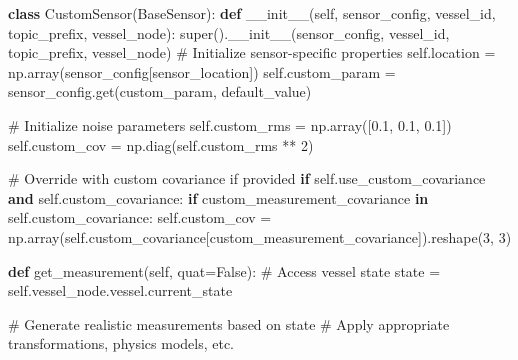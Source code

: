 \documentclass[
  letterpaper,
  DIV=11,
  numbers=noendperiod]{scrreprt}
\newenvironment{Shaded}{\begin{snugshade}}{\end{snugshade}}
\newcommand{\BuiltInTok}[1]{\textcolor[rgb]{0.00,0.23,0.31}{#1}}
\newcommand{\CommentTok}[1]{\textcolor[rgb]{0.37,0.37,0.37}{#1}}
\newcommand{\ControlFlowTok}[1]{\textcolor[rgb]{0.00,0.23,0.31}{\textbf{#1}}}
\newcommand{\DecValTok}[1]{\textcolor[rgb]{0.68,0.00,0.00}{#1}}
\newcommand{\FloatTok}[1]{\textcolor[rgb]{0.68,0.00,0.00}{#1}}
\newcommand{\FunctionTok}[1]{\textcolor[rgb]{0.28,0.35,0.67}{#1}}
\newcommand{\KeywordTok}[1]{\textcolor[rgb]{0.00,0.23,0.31}{\textbf{#1}}}
\newcommand{\NormalTok}[1]{\textcolor[rgb]{0.00,0.23,0.31}{#1}}
\newcommand{\OperatorTok}[1]{\textcolor[rgb]{0.37,0.37,0.37}{#1}}
\newcommand{\StringTok}[1]{\textcolor[rgb]{0.13,0.47,0.30}{#1}}
\newcommand{\VariableTok}[1]{\textcolor[rgb]{0.07,0.07,0.07}{#1}}
\begin{document}
\begin{Shaded}
\begin{Highlighting}[]
\KeywordTok{class}\NormalTok{ CustomSensor(BaseSensor):}
    \KeywordTok{def} \FunctionTok{\_\_init\_\_}\NormalTok{(}\VariableTok{self}\NormalTok{, sensor\_config, vessel\_id, topic\_prefix, vessel\_node):}
        \BuiltInTok{super}\NormalTok{().}\FunctionTok{\_\_init\_\_}\NormalTok{(sensor\_config, vessel\_id, topic\_prefix, vessel\_node)}
        \CommentTok{\# Initialize sensor{-}specific properties}
        \VariableTok{self}\NormalTok{.location }\OperatorTok{=}\NormalTok{ np.array(sensor\_config[}\StringTok{\textquotesingle{}sensor\_location\textquotesingle{}}\NormalTok{])}
        \VariableTok{self}\NormalTok{.custom\_param }\OperatorTok{=}\NormalTok{ sensor\_config.get(}\StringTok{\textquotesingle{}custom\_param\textquotesingle{}}\NormalTok{, default\_value)}
        
        \CommentTok{\# Initialize noise parameters}
        \VariableTok{self}\NormalTok{.custom\_rms }\OperatorTok{=}\NormalTok{ np.array([}\FloatTok{0.1}\NormalTok{, }\FloatTok{0.1}\NormalTok{, }\FloatTok{0.1}\NormalTok{])}
        \VariableTok{self}\NormalTok{.custom\_cov }\OperatorTok{=}\NormalTok{ np.diag(}\VariableTok{self}\NormalTok{.custom\_rms }\OperatorTok{**} \DecValTok{2}\NormalTok{)}
        
        \CommentTok{\# Override with custom covariance if provided}
        \ControlFlowTok{if} \VariableTok{self}\NormalTok{.use\_custom\_covariance }\KeywordTok{and} \VariableTok{self}\NormalTok{.custom\_covariance:}
            \ControlFlowTok{if} \StringTok{\textquotesingle{}custom\_measurement\_covariance\textquotesingle{}} \KeywordTok{in} \VariableTok{self}\NormalTok{.custom\_covariance:}
                \VariableTok{self}\NormalTok{.custom\_cov }\OperatorTok{=}\NormalTok{ np.array(}\VariableTok{self}\NormalTok{.custom\_covariance[}\StringTok{\textquotesingle{}custom\_measurement\_covariance\textquotesingle{}}\NormalTok{]).reshape(}\DecValTok{3}\NormalTok{, }\DecValTok{3}\NormalTok{)}

    \KeywordTok{def}\NormalTok{ get\_measurement(}\VariableTok{self}\NormalTok{, quat}\OperatorTok{=}\VariableTok{False}\NormalTok{):}
        \CommentTok{\# Access vessel state}
\NormalTok{        state }\OperatorTok{=} \VariableTok{self}\NormalTok{.vessel\_node.vessel.current\_state}
        
        \CommentTok{\# Generate realistic measurements based on state}
        \CommentTok{\# Apply appropriate transformations, physics models, etc.}
        

\end{Highlighting}
\end{Shaded}
\end{document}
